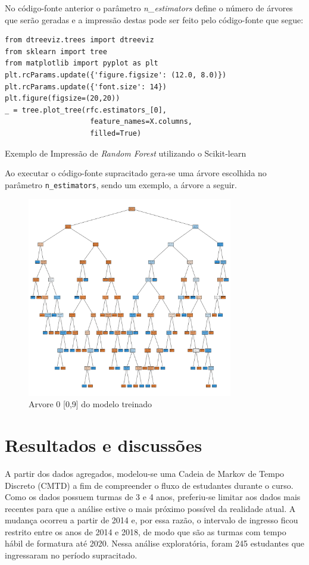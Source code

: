 \documentclass{article}
\begin{document}
No código-fonte anterior o parâmetro \textit{n\_estimators} define o número de árvores que serão geradas e a impressão destas pode ser feito pelo código-fonte que segue:

\begin{listing}[H]
\begin{verbatim}
from dtreeviz.trees import dtreeviz
from sklearn import tree
from matplotlib import pyplot as plt
plt.rcParams.update({'figure.figsize': (12.0, 8.0)})
plt.rcParams.update({'font.size': 14})
plt.figure(figsize=(20,20))
_ = tree.plot_tree(rfc.estimators_[0], 
                    feature_names=X.columns,
                    filled=True)
\end{verbatim}
\caption{Exemplo de Impressão de \emph{Random Forest} utilizando o Scikit-learn}
\end{listing}

Ao executar o código-fonte supracitado gera-se uma árvore escolhida no parâmetro \texttt{n\_estimators}, sendo um exemplo, a árvore a seguir. 

\begin{figure}[H]
\centering
\includegraphics[width=0.8\textwidth]{tree_0.png}
\caption{Arvore 0 [0,9] do modelo treinado}
\label{Tree}
\end{figure}

\section{Resultados e discussões}

A partir dos dados agregados, modelou-se uma Cadeia de Markov de Tempo Discreto (CMTD) a fim de compreender o fluxo de estudantes durante o curso. Como os dados possuem turmas de 3 e 4 anos, preferiu-se limitar aos dados mais recentes para que a análise estive o mais próximo possível da realidade atual. A mudança ocorreu a partir de 2014 e, por essa razão, o intervalo de ingresso ficou restrito entre os anos de 2014 e 2018, de modo que são as turmas com tempo hábil de formatura até 2020. Nessa análise exploratória, foram 245 estudantes que ingressaram no período supracitado.
\end{document}
